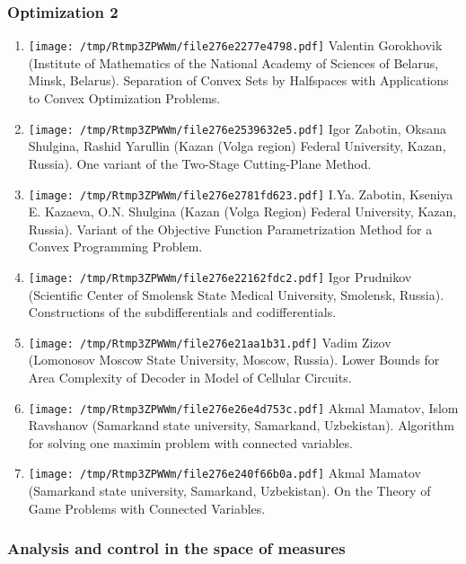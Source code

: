\documentclass[
]{article}
\providecommand{\tightlist}{%
  \setlength{\itemsep}{0pt}\setlength{\parskip}{0pt}}
\begin{document}
\hypertarget{o2}{%
\subsubsection{Optimization 2}\label{o2}}

\begin{enumerate}
\def\labelenumi{\arabic{enumi}.}
\tightlist
\item
  \protect\texttt{[image: /tmp/Rtmp3ZPWWm/file276e2277e4798.pdf]}
  Valentin Gorokhovik (Institute of Mathematics of the National Academy
  of Sciences of Belarus, Minsk, Belarus). Separation of Convex Sets by
  Halfspaces with Applications to Convex Optimization Problems.
\item
  \protect\texttt{[image: /tmp/Rtmp3ZPWWm/file276e2539632e5.pdf]}
  Igor Zabotin, Oksana Shulgina, Rashid Yarullin (Kazan (Volga region)
  Federal University, Kazan, Russia). One variant of the Two-Stage
  Cutting-Plane Method.
\item
  \protect\texttt{[image: /tmp/Rtmp3ZPWWm/file276e2781fd623.pdf]}
  I.Ya. Zabotin, Kseniya E. Kazaeva, O.N. Shulgina (Kazan (Volga Region)
  Federal University, Kazan, Russia). Variant of the Objective Function
  Parametrization Method for a Convex Programming Problem.
\item
  \protect\texttt{[image: /tmp/Rtmp3ZPWWm/file276e22162fdc2.pdf]}
  Igor Prudnikov (Scientific Center of Smolensk State Medical
  University, Smolensk, Russia). Constructions of the subdifferentials
  and codifferentials.
\item
  \protect\texttt{[image: /tmp/Rtmp3ZPWWm/file276e21aa1b31.pdf]}
  Vadim Zizov (Lomonosov Moscow State University, Moscow, Russia). Lower
  Bounds for Area Complexity of Decoder in Model of Cellular Circuits.
\item
  \protect\texttt{[image: /tmp/Rtmp3ZPWWm/file276e26e4d753c.pdf]}
  Akmal Mamatov, Islom Ravshanov (Samarkand state university, Samarkand,
  Uzbekistan). Algorithm for solving one maximin problem with connected
  variables.
\item
  \protect\texttt{[image: /tmp/Rtmp3ZPWWm/file276e240f66b0a.pdf]}
  Akmal Mamatov (Samarkand state university, Samarkand, Uzbekistan). On
  the Theory of Game Problems with Connected Variables.
\end{enumerate}

\hypertarget{meas}{%
\subsubsection{Analysis and control in the space of
measures}\label{meas}}
\end{document}

